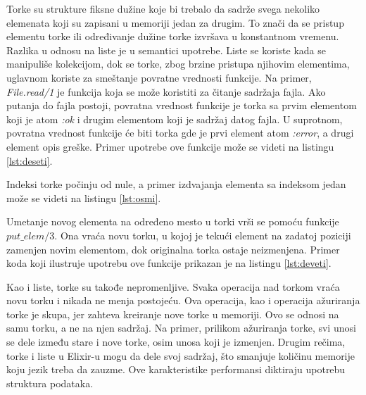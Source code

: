 \documentclass[12pt,oneside]{memoir}
\begin{document}


Torke su strukture fiksne dužine koje bi trebalo da sadrže svega nekoliko elemenata koji su zapisani u memoriji jedan za drugim. To znači da se pristup elementu torke ili određivanje dužine torke izvršava u konstantnom vremenu. Razlika u odnosu na liste je u semantici upotrebe. Liste se koriste kada se manipuliše kolekcijom, dok se torke, zbog brzine pristupa njihovim elementima, uglavnom koriste za smeštanje povratne vrednosti funkcije. Na primer, \textit{File.read/1} je funkcija koja se može koristiti za čitanje sadržaja fajla. Ako putanja do fajla postoji, povratna vrednost funkcije je torka sa prvim elementom koji je atom \textit{:ok} i drugim elementom koji je sadržaj datog fajla. U suprotnom, povratna vrednost funkcije će biti torka gde je prvi element atom \textit{:error}, a drugi element opis greške. Primer upotrebe ove funkcije može se videti na listingu \ref{lst:deseti}.

\begin{minipage}{\linewidth}

\end{minipage}

Indeksi torke počinju od nule, a primer izdvajanja elementa sa indeksom jedan može se videti na listingu \ref{lst:osmi}.



Umetanje novog elementa na određeno mesto u torki vrši se pomoću funkcije $put\_elem/3$. Ona vraća novu torku, u kojoj je tekući element na zadatoj poziciji zamenjen novim elementom, dok originalna torka ostaje neizmenjena. Primer koda koji ilustruje upotrebu ove funkcije prikazan je na listingu \ref{lst:deveti}.



Kao i liste, torke su takođe nepromenljive. Svaka operacija nad torkom vraća novu torku i nikada ne menja postojeću. Ova operacija, kao i operacija ažuriranja torke je skupa, jer zahteva kreiranje nove torke u memoriji. Ovo se odnosi na samu torku, a ne na njen sadržaj. Na primer, prilikom ažuriranja torke, svi unosi se dele između stare i nove torke, osim unosa koji je izmenjen. Drugim rečima, torke i liste u Elixir-u mogu da dele svoj sadržaj, što smanjuje količinu memorije koju jezik treba da zauzme. Ove karakteristike performansi diktiraju upotrebu struktura podataka. 
\end{document}
